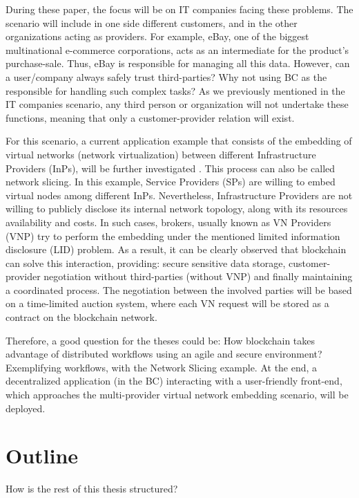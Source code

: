 During these paper, the focus will be on IT companies facing these problems. The scenario will include in one side different customers, and in the other organizations acting as providers. For example, eBay, one of the biggest multinational e-commerce corporations, acts as an intermediate for the product's purchase-sale. Thus, eBay is responsible for managing all this data. However, can a user/company always safely trust third-parties? Why not using BC as the responsible for handling such complex tasks? As we previously mentioned in the IT companies scenario, any third person or organization will not undertake these functions, meaning that only a customer-provider relation will exist. 

For this scenario, a current application example that consists of the embedding of virtual networks (network virtualization) between different Infrastructure Providers (InPs), will be further investigated \cite{dietrich2015multi}. This process can also be called network slicing. In this example, Service Providers (SPs) are willing to embed virtual nodes among different InPs. Nevertheless, Infrastructure Providers are not willing to publicly disclose its internal network topology, along with its resources availability and costs. In such cases, brokers, usually known as VN Providers (VNP) try to perform the embedding under the mentioned limited information disclosure (LID) problem. As a result, it can be clearly observed that blockchain can solve this interaction, providing: secure sensitive data storage, customer-provider negotiation without third-parties (without VNP) and finally maintaining a coordinated process. The negotiation between the involved parties will be based on a time-limited auction system, where each VN request will be stored as a contract on the blockchain network.

Therefore, a good question for the theses could be: How blockchain takes advantage of distributed workflows using an agile and secure environment? Exemplifying workflows, with the Network Slicing example. At the end, a decentralized application (in the BC) interacting with a user-friendly front-end, which approaches the multi-provider virtual network embedding scenario, will be deployed.


\section{Outline}
How is the rest of this thesis structured?



